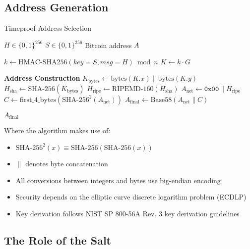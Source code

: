 \documentclass[12pt]{report}
\begin{document}
\subsection{Address Generation}

\begin{algorithm}
\caption{Timeproof Address Selection}
\label{alg:address}
\begin{algorithmic}[1]
    \Require $H \in \{0,1\}^{256}$ 
    \Require $S \in \{0,1\}^{256}$ 
    \Ensure Bitcoin address $A$
    
    \State $k \gets \text{HMAC-SHA256}(key=S, msg=H) \bmod n$ 
    \State $K \gets k \cdot G$ 
    
    \State \textbf{Address Construction}
    \State $K_{\text{bytes}} \gets \text{bytes}(K.x) \parallel \text{bytes}(K.y)$
    \State $H_{\text{sha}} \gets \text{SHA-256}(K_{\text{bytes}})$
    \State $H_{\text{ripe}} \gets \text{RIPEMD-160}(H_{\text{sha}})$
    \State $A_{\text{net}} \gets \mathtt{0x00} \parallel H_{\text{ripe}}$
    \State $C \gets \text{first\_4\_bytes}(\text{SHA-256}^2(A_{\text{net}}))$
    \State $A_{\text{final}} \gets \text{Base58}(A_{\text{net}} \parallel C)$
    
    \State \Return $A_{\text{final}}$
\EndProcedure
\end{algorithmic}
\end{algorithm}

Where the algorithm makes use of:
\begin{itemize}
    \item $\text{SHA-256}^2(x) \equiv \text{SHA-256}(\text{SHA-256}(x))$
    \item $\parallel$ denotes byte concatenation
    \item All conversions between integers and bytes use big-endian encoding
    \item Security depends on the elliptic curve discrete logarithm problem (ECDLP) \cite{BlakeSeroussiSmart1999}
    \item Key derivation follows NIST SP 800-56A Rev. 3 key derivation guidelines
\end{itemize}

\subsection{The Role of the Salt}
\end{document}
